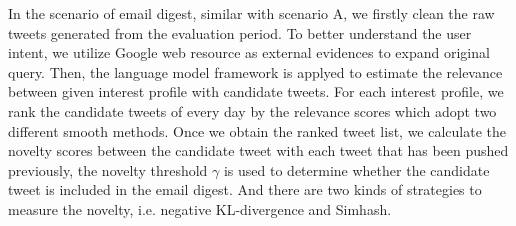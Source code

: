 In the scenario of email digest, similar with scenario A,
we firstly clean the raw tweets generated from the evaluation period.
To better understand the user intent,
we utilize Google web resource as external evidences to expand original query.
Then, the language model framework is applyed to estimate the relevance between given interest profile with candidate tweets.
For each interest profile,
we rank the candidate tweets of every day by the relevance scores which adopt two different smooth methods. 
Once we obtain the ranked tweet list,
we calculate the novelty scores between the candidate tweet with each tweet that has been pushed previously,
the novelty threshold $\gamma$ is used to determine whether the candidate tweet is included in the email digest.
And there are two kinds of strategies to measure the novelty, i.e. negative KL-divergence and Simhash.


